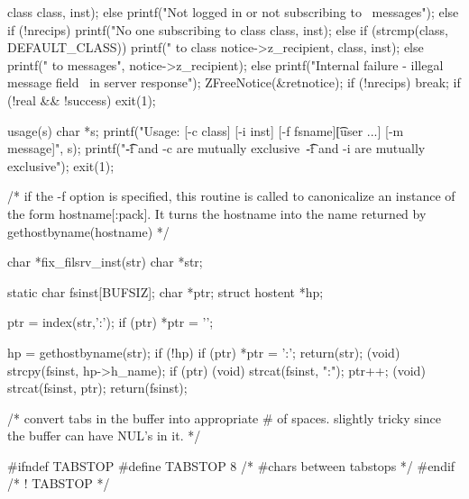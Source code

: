 \begin{code}
{{{{class %
                                   class, inst);
                        else
                            printf("Not logged in or not subscribing to \
messages\n");
                    } 
                    else
                        if (!nrecips)
                            printf("No one subscribing to class %
                                   class, inst);
                        else {
                            if (strcmp(class, DEFAULT_CLASS))
                                printf("%
to class %
                                       notice->z_recipient, class, inst);
                            else
                                printf("%
to messages\n", 
                                       notice->z_recipient);
                        } 
                } 
                else
                    printf("Internal failure - illegal message field \
in server response\n");
        ZFreeNotice(&retnotice);
        if (!nrecips)
            break;
    }
    if (!real && !success)
        exit(1);
} 

usage(s)
    char *s;
{
    printf("Usage: %
[-c class] [-i inst] [-f fsname]\n\t[user ...] [-m message]\n", s);
    printf("\t-f and -c are mutually exclusive\n\
\t-f and -i are mutually exclusive\n");
    exit(1);
} 

/*
  if the -f option is specified, this routine is called to canonicalize
  an instance of the form hostname[:pack].  It turns the hostname into the
  name returned by gethostbyname(hostname)
 */

char *fix_filsrv_inst(str)
char *str;
{
        static char fsinst[BUFSIZ];
        char *ptr;
        struct hostent *hp;

        ptr = index(str,':');
        if (ptr)
                *ptr = '\0';
        
        hp = gethostbyname(str);
        if (!hp) {
                if (ptr)
                        *ptr = ':';
                return(str);
        }
        (void) strcpy(fsinst, hp->h_name);
        if (ptr) {
                (void) strcat(fsinst, ":");
                ptr++;
                (void) strcat(fsinst, ptr);
        }
        return(fsinst);
}

/* convert tabs in the buffer into appropriate # of spaces.
   slightly tricky since the buffer can have NUL's in it. */

#ifndef TABSTOP
#define TABSTOP 8                       /* #chars between tabstops */
#endif /* ! TABSTOP */


\end{code}
